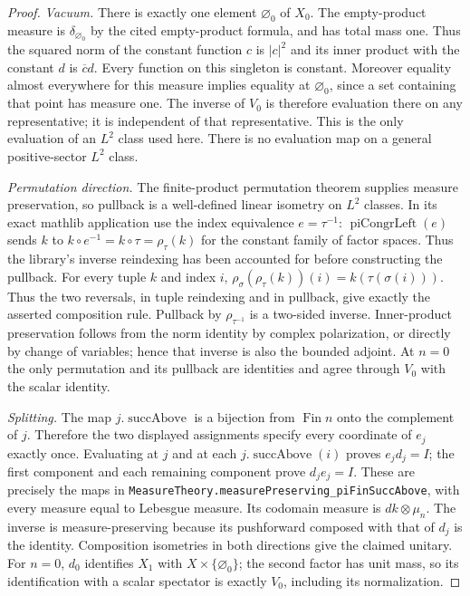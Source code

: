 \documentclass[11pt,a4paper]{article}
\theoremstyle{definition}
\theoremstyle{remark}
\begin{document}
\begin{proof}
\emph{Vacuum.} There is exactly one element $\varnothing_0$ of
$X_0$. The empty-product measure is
$\delta_{\varnothing_0}$ by the cited empty-product formula, and
has total mass one. Thus the squared norm of the constant function
$c$ is $|c|^2$ and its inner product with the constant $d$ is
$\overline c d$. Every function on this singleton is constant.
Moreover equality almost everywhere for this measure implies
equality at $\varnothing_0$, since a set containing that point has
measure one. The inverse of $V_0$ is therefore evaluation there
on any representative; it is independent of that representative.
This is the only evaluation of an $L^2$ class used here. There is
no evaluation map on a general positive-sector $L^2$ class.

\emph{Permutation direction.} The finite-product permutation theorem
supplies measure preservation, so pullback is a well-defined
linear isometry on $L^2$ classes. In its exact mathlib application
use the index equivalence $e=\tau^{-1}$:
$\operatorname{piCongrLeft}(e)$ sends $k$ to
$k\circ e^{-1}=k\circ\tau=\rho_\tau(k)$ for the constant
family of factor spaces. Thus the library's inverse reindexing
has been accounted for before constructing the pullback. For every tuple $k$ and index $i$,
$\rho_\sigma(\rho_\tau(k))(i)=k(\tau(\sigma(i)))$.
Thus the two reversals, in tuple reindexing and in pullback,
give exactly the asserted composition rule. Pullback by
$\rho_{\tau^{-1}}$ is a two-sided inverse. Inner-product
preservation follows from the norm identity by complex
polarization, or directly by change of variables; hence that
inverse is also the bounded adjoint. At $n=0$ the only permutation
and its pullback are identities and agree through $V_0$ with
the scalar identity.

\emph{Splitting.} The map $j.\operatorname{succAbove}$ is a bijection
from $\operatorname{Fin}n$ onto the complement of $j$. Therefore
the two displayed assignments specify every coordinate of $e_j$
exactly once. Evaluating at $j$ and at each
$j.\operatorname{succAbove}(i)$ proves $e_jd_j=I$;
the first component and each remaining component prove $d_je_j=I$.
These are precisely the maps in
\nolinkurl{MeasureTheory.measurePreserving_piFinSuccAbove}, with
every measure equal to Lebesgue measure. Its codomain measure is
$dk\otimes\mu_n$. The inverse is measure-preserving because
its pushforward composed with that of $d_j$ is the identity.
Composition isometries in both directions give the claimed unitary.
For $n=0$, $d_0$ identifies $X_1$ with $X\times\{\varnothing_0\}$;
the second factor has unit mass, so its identification with a
scalar spectator is exactly $V_0$, including its normalization.
\end{proof}
\end{document}
